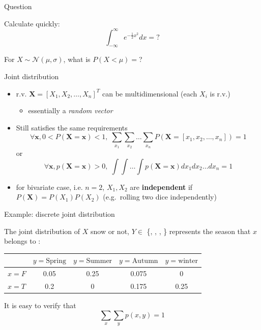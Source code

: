 \documentclass[ignorenonframetext,]{beamer}
\providecommand{\tightlist}{%
  \setlength{\itemsep}{0pt}\setlength{\parskip}{0pt}}
\newcommand{\normal}[2]{\ensuremath{\mathcal{N}\left (#1,#2 \right )}}
\newcommand{\vv}[1]{\boldsymbol{#1}}
\begin{document}
\begin{frame}{Question}
\protect\hypertarget{question}{}

Calculate quickly: \[\int_{-\infty}^{\infty} e^{-\frac{1}{2}x^2}dx = ?\]

\bigskip

For \(X\sim \normal{\mu}{\sigma}\), what is \(P(X<\mu)=\)?

\end{frame}

\begin{frame}{Joint distribution}
\protect\hypertarget{joint-distribution}{}

\begin{itemize}
\tightlist
\item
  r.v. \(\vv{X} = [X_1, X_2, \ldots, X_n]^T\) can be multidimensional
  (each \(X_i\) is r.v.)

  \begin{itemize}
  \tightlist
  \item
    essentially a \emph{random vector}
  \end{itemize}

  \bigskip
\item
  Still satisfies the same requirements
  \[\forall \vv{x}, 0<P(\vv{X}=\vv{x}) <1,\; \sum_{x_1}\sum_{x_2}\ldots\sum_{x_n} P(\vv{X} =[x_1, x_2, \ldots, x_n]) =1\]
  or
  \[\forall \vv{x}, p(\vv{X}=\vv{x}) >0,\; \int\int\ldots\int p(\vv{X} =\vv{x})d{x_1}d{x_2\ldots dx_{n}} =1\]
  \bigskip 
\item
  for bivariate case, i.e. \(n=2\), \(X_1, X_2\) are
  \textbf{independent} if \(P(\vv{X}) = P(X_1)P(X_2)\) (e.g.~rolling two
  dice independently)
\end{itemize}

\end{frame}

\begin{frame}{Example: discrete joint distribution}
\protect\hypertarget{example-discrete-joint-distribution}{}

The joint distribution of \(X\) snow or not, \(Y\in\) \{,
, , \} represents the season that
\(x\) belongs to : \bigskip 

\begin{table}\centering
\begin{tabular}{ l | c | c | c | c}
   \centering                    
   & $y=\text{Spring}$ & $y=\text{Summer}$ &$y=\text{Autumn}$ & $y=\text{winter}$\\ 
   \hline
  $x= F$ & 0.05 & 0.25 & 0.075& 0\\
    \hline 
  $x= T$ & 0.2 & 0 & 0.175& 0.25\\ 
\end{tabular}
\end{table}
\bigskip

It is easy to verify that\\
\[\sum_x\sum_y p(x, y) = 1\]

\end{frame}
\end{document}
